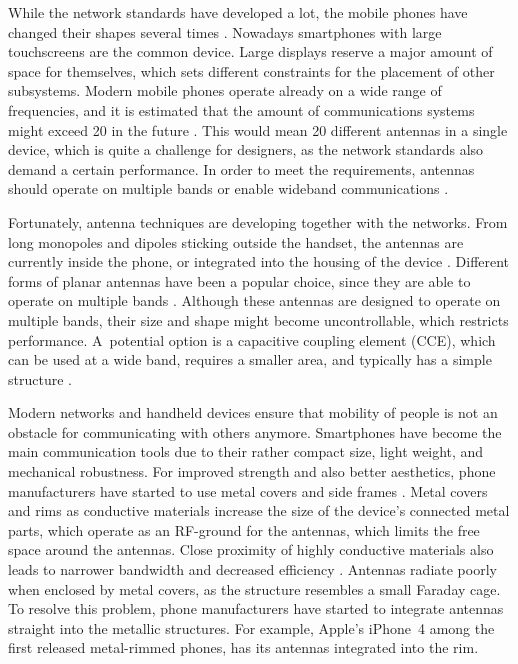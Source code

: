 While the network standards have developed a lot, the mobile phones have changed their shapes several times \cite{anguera2}. Nowadays smartphones with large touchscreens are the common device. Large displays reserve a major amount of space for themselves, which sets different constraints for the placement of other subsystems. Modern mobile phones operate already on a wide range of frequencies, and it is estimated that the amount of communications systems might exceed 20 in the future \cite{20ant}. This would mean 20 different antennas in a single device, which is quite a challenge for designers, as the network standards also demand a certain performance. In order to meet the requirements, antennas should operate on multiple bands or enable wideband communications \cite{lehtovuori_wideband_match}.

Fortunately, antenna techniques are developing together with the networks. From long monopoles and dipoles sticking outside the handset, the antennas are currently inside the phone, or integrated into the housing of the device \cite{saunders,molisch}. Different forms of planar antennas have been a popular choice, since they are able to operate on multiple bands \cite{anguera}. Although these antennas are designed to operate on multiple bands, their size and shape might become uncontrollable, which restricts performance. A~potential option is a capacitive coupling element (CCE), which can be used at a wide band, requires a smaller area, and typically has a simple structure \cite{valkonen_cce2}.

Modern networks and handheld devices ensure that mobility of people is not an obstacle for communicating with others anymore. Smartphones have become the main communication tools due to their rather compact size, light weight, and mechanical robustness. For improved strength and also better aesthetics, phone manufacturers have started to use metal covers and side frames \cite{rowell}. Metal covers and rims as conductive materials increase the size of the device's connected metal parts, which operate as an RF-ground for the antennas, which limits the free space around the antennas. Close proximity of highly conductive materials also leads to narrower bandwidth and decreased efficiency \cite{rowell}. Antennas radiate poorly when enclosed by metal covers, as the structure resembles a small Faraday cage. To resolve this problem, phone manufacturers have started to integrate antennas straight into the metallic structures. For example, Apple's iPhone~4 among the first released metal-rimmed phones, has its antennas integrated into the rim. 

